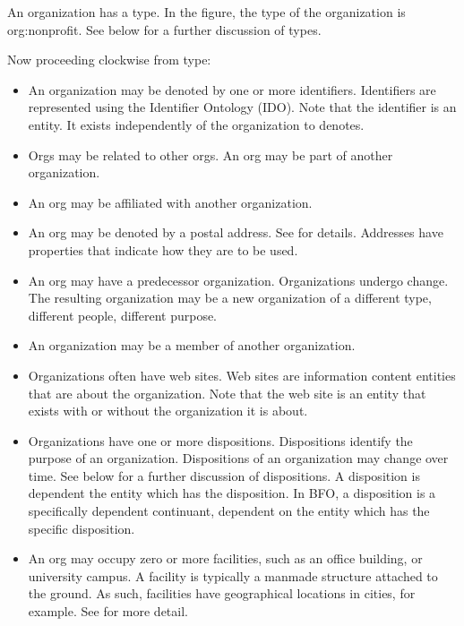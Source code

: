 \documentclass[letterpaper,10pt,english]{sphinxmanual}
\begin{document}
\sphinxAtStartPar
An organization has a type.  In the figure, the type of the organization is
org:nonprofit.  See below for a further discussion of types.

\sphinxAtStartPar
Now proceeding clockwise from type:
\begin{itemize}
\item {} 
\sphinxAtStartPar
An organization may be denoted by one or more identifiers.  Identifiers are represented
using the Identifier Ontology (IDO).  Note that the identifier is an entity.  It exists
independently of the organization to denotes.

\item {} 
\sphinxAtStartPar
Orgs may be related to other orgs.  An org may be part of another organization.

\item {} 
\sphinxAtStartPar
An org may be affiliated with another organization.

\item {} 
\sphinxAtStartPar
An org may be denoted by a postal address.  See {\hyperref[\detokenize{addresses::doc}]{}} for
details.  Addresses have
properties that indicate how they are to be used.

\item {} 
\sphinxAtStartPar
An org may have a predecessor organization.  Organizations undergo change.  The
resulting
organization may be a new organization of a different type, different people, different
purpose.

\item {} 
\sphinxAtStartPar
An organization may be a member of another organization.

\item {} 
\sphinxAtStartPar
Organizations often have web sites.  Web sites are information content entities that are
about the organization.  Note that the web site is an entity that exists with or without
the organization it is about.

\item {} 
\sphinxAtStartPar
Organizations have one or more dispositions.  Dispositions identify the purpose of an
organization.  Dispositions of an organization may change over time.  See below for a
further discussion of dispositions.  A disposition is dependent the entity which
has the disposition.  In BFO, a disposition is a specifically dependent continuant,
dependent on the entity which has the specific disposition.

\item {} 
\sphinxAtStartPar
An org may occupy zero or more facilities, such as an office building, or university
campus. A facility
is typically a man\sphinxhyphen{}made structure attached to the ground.  As such, facilities have
geographical locations \textendash{} in cities, for example.  See {\hyperref[\detokenize{facilities::doc}]{}}
for more detail.


\end{itemize}
\end{document}
